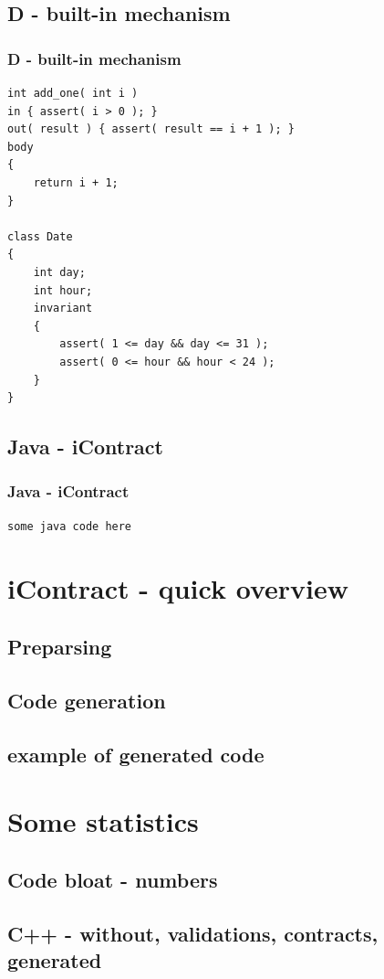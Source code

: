 \documentclass{beamer}
\begin{document}
\subsection{D - built-in mechanism}
\begin{frame}[fragile]
\frametitle{D - built-in mechanism}
\begin{lstlisting}[caption=http://www.open-std.org/jtc1/sc22/wg21/docs/papers/2004/n1613.pdf]
int add_one( int i )
in { assert( i > 0 ); }
out( result ) { assert( result == i + 1 ); }
body
{
    return i + 1;
}

class Date
{
    int day;
    int hour;
    invariant
    {
        assert( 1 <= day && day <= 31 );
        assert( 0 <= hour && hour < 24 );
    }
}
\end{lstlisting}
\end{frame}

\subsection{Java - iContract}
\begin{frame}[fragile]
\frametitle{Java - iContract}
\begin{lstlisting}
some java code here
\end{lstlisting}
\end{frame}

\section{iContract - quick overview}
\subsection{Preparsing}
\subsection{Code generation}
\subsection{example of generated code}


\section{Some statistics}
\subsection{Code bloat - numbers}
\subsection{C++ - without, validations, contracts, generated}
\end{document}
